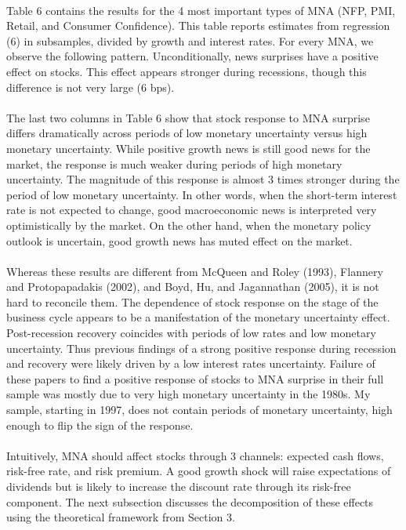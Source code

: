 \documentclass[12pt]{article}
\begin{document}
\paragraph{}
Table 6 contains the results for the 4 most important types of MNA (NFP, PMI, Retail, and Consumer Confidence). This table reports estimates from regression (6) in subsamples, divided by growth and interest rates. For every MNA, we observe the following pattern. Unconditionally, news surprises have a positive effect on stocks. This effect appears stronger during recessions, though this difference is not very large (6 bps). 
\paragraph{}
The last two columns in Table 6 show that stock response to MNA surprise differs dramatically across periods of low monetary uncertainty versus high monetary uncertainty. While positive growth news is still good news for the market, the response is much weaker during periods of high monetary uncertainty. The magnitude of this response is almost 3 times stronger during the period of low monetary uncertainty. In other words, when the short-term interest rate is not expected to change, good macroeconomic news is interpreted very optimistically by the market. On the other hand, when the monetary policy outlook is uncertain, good growth news has muted effect on the market.
\paragraph{}
Whereas these results are different from McQueen and Roley (1993), Flannery and Protopapadakis (2002), and Boyd, Hu, and Jagannathan (2005), it is not hard to reconcile them. The dependence of stock response on the stage of the business cycle appears to be a manifestation of the monetary uncertainty effect. Post-recession recovery coincides with periods of low rates and low monetary uncertainty. Thus previous findings of a strong positive response during recession and recovery were likely driven by a low interest rates uncertainty. Failure of these papers to find a positive response of stocks to MNA surprise in their full sample was mostly due to very high monetary uncertainty in the 1980s. My sample, starting in 1997, does not contain periods of monetary uncertainty, high enough to flip the sign of the response.
\paragraph{}
Intuitively, MNA should affect stocks through 3 channels: expected cash flows, risk-free rate, and risk premium. A good growth shock will raise expectations of dividends but is likely to increase the discount rate through its risk-free component. The next subsection discusses the decomposition of these effects using the theoretical framework from Section 3.
\end{document}
